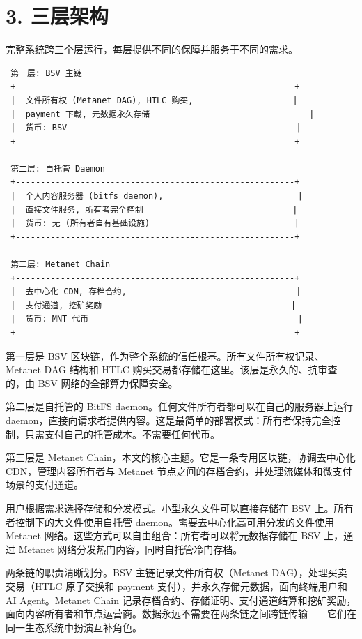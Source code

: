 \documentclass[11pt,a4paper]{article}
\begin{document}
\section{3. 三层架构}

完整系统跨三个层运行，每层提供不同的保障并服务于不同的需求。

\begin{lstlisting}
 第一层: BSV 主链
 +--------------------------------------------------------+
 |  文件所有权 (Metanet DAG), HTLC 购买,                    |
 |  payment 下载, 元数据永久存储                                |
 |  货币: BSV                                              |
 +--------------------------------------------------------+

 第二层: 自托管 Daemon
 +--------------------------------------------------------+
 |  个人内容服务器 (bitfs daemon),                           |
 |  直接文件服务, 所有者完全控制                              |
 |  货币: 无 (所有者自有基础设施)                             |
 +--------------------------------------------------------+

 第三层: Metanet Chain
 +--------------------------------------------------------+
 |  去中心化 CDN, 存档合约,                                  |
 |  支付通道, 挖矿奖励                                      |
 |  货币: MNT 代币                                          |
 +--------------------------------------------------------+
\end{lstlisting}

第一层是 BSV 区块链，作为整个系统的信任根基。所有文件所有权记录、Metanet DAG 结构和 HTLC 购买交易都存储在这里。该层是永久的、抗审查的，由 BSV 网络的全部算力保障安全。

第二层是自托管的 BitFS daemon。任何文件所有者都可以在自己的服务器上运行 daemon，直接向请求者提供内容。这是最简单的部署模式：所有者保持完全控制，只需支付自己的托管成本。不需要任何代币。

第三层是 Metanet Chain，本文的核心主题。它是一条专用区块链，协调去中心化 CDN，管理内容所有者与 Metanet 节点之间的存档合约，并处理流媒体和微支付场景的支付通道。

用户根据需求选择存储和分发模式。小型永久文件可以直接存储在 BSV 上。所有者控制下的大文件使用自托管 daemon。需要去中心化高可用分发的文件使用 Metanet 网络。这些方式可以自由组合：所有者可以将元数据存储在 BSV 上，通过 Metanet 网络分发热门内容，同时自托管冷门存档。

两条链的职责清晰划分。BSV 主链记录文件所有权（Metanet DAG），处理买卖交易（HTLC 原子交换和 payment 支付），并永久存储元数据，面向终端用户和 AI Agent。Metanet Chain 记录存档合约、存储证明、支付通道结算和挖矿奖励，面向内容所有者和节点运营商。数据永远不需要在两条链之间跨链传输——它们在同一生态系统中扮演互补角色。
\end{document}
